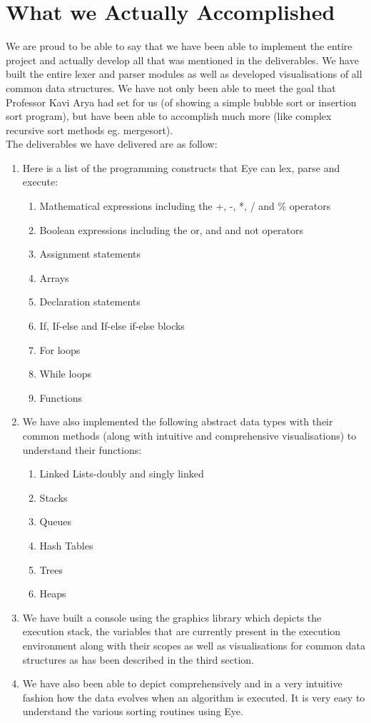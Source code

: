 \documentclass{article}
\begin{document}
\section{What we Actually Accomplished}
We are proud to be able to say that we have been able to implement the entire project and actually develop all that was mentioned in the deliverables. We have built the entire lexer and parser modules as well as developed visualisations of all common data structures. We have not only been able to meet the goal that Professor Kavi Arya had set for us (of showing a simple bubble sort or insertion sort program), but have been able to accomplish much more (like complex recursive sort methods eg. mergesort).\\
The deliverables we have delivered are as follow:
\begin{enumerate}
    \item 
Here is a list of the programming constructs that Eye can lex, parse and execute:
\begin{enumerate}
        \item Mathematical expressions including the +, -, *, / and \% operators
        \item Boolean expressions including the or, and and not operators
        \item Assignment statements
        \item Arrays
        \item Declaration statements
        \item If, If-else and If-else if-else blocks
        \item For loops
        \item While loops
        \item Functions
    \end{enumerate}
    
\item 
We have also implemented the following abstract data types with their common methods (along with intuitive and comprehensive visualisations) to understand their functions:
\begin{enumerate}
        \item Linked Lists-doubly and singly linked
        \item Stacks
        \item Queues
        \item Hash Tables
        \item Trees
        \item Heaps
    \end{enumerate}
\item We have built a console using the graphics library which depicts the execution stack, the variables that are currently present in the execution environment along with their scopes as well as visualisations for common data structures as has been described in the third section.
\item 
We have also been able to depict comprehensively and in a very intuitive fashion how the data evolves when an algorithm is executed. It is very easy to understand the various sorting routines using Eye.

\end{enumerate}
\end{document}
